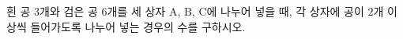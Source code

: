 흰 공 $3$개와 검은 공 $6$개를 세 상자 $\mathrm{A}$, $\mathrm{B}$, $\mathrm{C}$에 나누어 넣을 때, 각 상자에 공이 $2$개 이상씩 들어가도록 나누어 넣는 경우의 수를 구하시오. 
